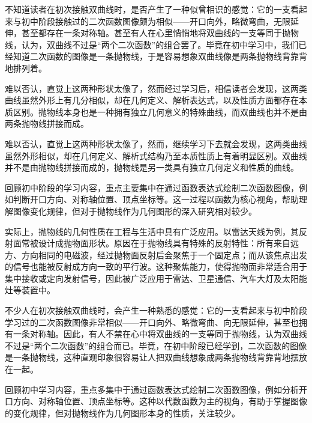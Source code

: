 
\begin{issues}
\issueDraft
\end{issues}


不知道读者在初次接触双曲线时，是否产生了一种似曾相识的感觉：它的一支看起来与初中阶段接触过的二次函数图像颇为相似——开口向外，略微弯曲，无限延伸，甚至都存在一条对称轴。甚至有人在心里悄悄地将双曲线的一支等同于抛物线，认为，双曲线不过是“两个二次函数”的组合罢了。毕竟在初中学习中，我们已经知道二次函数的图像是一条抛物线，于是容易想象双曲线像是两条抛物线背靠背地排列着。

难以否认，直觉上这两种形状太像了，然而经过学习后，相信读者会发现，这两类曲线虽然外形上有几分相似，却在几何定义、解析表达式，以及性质方面都存在本质区别。抛物线本身也是一种拥有独立几何意义的特殊曲线，而双曲线也并不是由两条抛物线拼接而成。

难以否认，直觉上这两种形状太像了，然而，继续学习下去就会发现，这两类曲线虽然外形相似，却在几何定义、解析式结构乃至本质性质上有着明显区别。双曲线并不是由抛物线拼接而成的，抛物线是另一类具有独立几何定义和性质的曲线。

回顾初中阶段的学习内容，重点主要集中在通过函数表达式绘制二次函数图像，例如判断开口方向、对称轴位置、顶点坐标等。这一过程以函数为核心视角，帮助理解图像变化规律，但对于抛物线作为几何图形的深入研究相对较少。

实际上，抛物线的几何性质在工程与生活中具有广泛应用。以雷达天线为例，其反射面常被设计成抛物面形状。原因在于抛物线具有特殊的反射特性：所有来自远方、方向相同的电磁波，经过抛物面反射后会聚焦于一个固定点；而从该焦点出发的信号也能被反射成方向一致的平行波。这种聚焦能力，使得抛物面非常适合用于集中接收或定向发射信号，因此被广泛应用于雷达、卫星通信、汽车大灯及太阳能灶等装置中。


不少人在初次接触双曲线时，会产生一种熟悉的感觉：它的一支看起来与初中阶段学习过的二次函数图像非常相似——开口向外、略微弯曲、向无限延伸，甚至也拥有一条对称轴。因此，有人不禁在心中将双曲线的一支等同于抛物线，认为双曲线不过是“两个二次函数”的组合而已。毕竟，在初中阶段已经学到，二次函数的图像是一条抛物线，这种直观印象很容易让人把双曲线想象成两条抛物线背靠背地摆放在一起。



回顾初中学习内容，重点多集中于通过函数表达式绘制二次函数图像，例如分析开口方向、对称轴位置、顶点坐标等。这种以代数函数为主的视角，有助于掌握图像的变化规律，但对抛物线作为几何图形本身的性质，关注较少。

